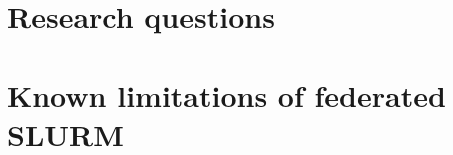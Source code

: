 \documentclass[conference]{IEEEtran}
\begin{document}
\section{Research questions}








\section{Known limitations of federated SLURM}

\end{document}
